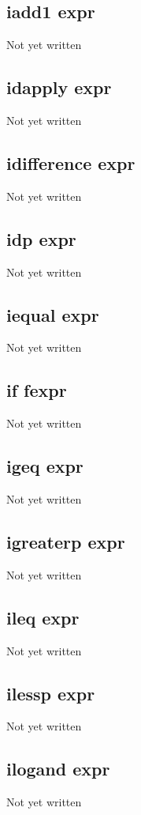 \documentclass[a4paper,11pt]{article}
\begin{document}
{\subsection{\ttfamily iadd1 expr}
   Not yet written

\subsection{\ttfamily idapply expr}
   Not yet written

\subsection{\ttfamily idifference expr}
   Not yet written

\subsection{\ttfamily idp expr}
   Not yet written

\subsection{\ttfamily iequal expr}
   Not yet written

\subsection{\ttfamily if fexpr}
   Not yet written

\subsection{\ttfamily igeq expr}
   Not yet written

\subsection{\ttfamily igreaterp expr}
   Not yet written

\subsection{\ttfamily ileq expr}
   Not yet written

\subsection{\ttfamily ilessp expr}
   Not yet written

\subsection{\ttfamily ilogand expr}
   Not yet written

}
\end{document}
